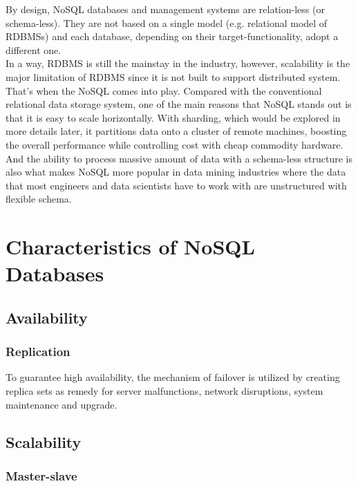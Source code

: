 \noindent By design, NoSQL databases and management systems are relation-less (or
schema-less). They are not based on a single model (e.g. relational
model of RDBMSs) and each database, depending on their
target-functionality, adopt a different one.\\


\noindent In a way, RDBMS is still the mainstay in the industry, however, scalability is the major limitation of RDBMS since it is not built to support distributed system. That's when the NoSQL comes into play. Compared with the conventional relational data storage system, one of the main reasons that NoSQL stands out is that it is easy to scale horizontally. With sharding, which would be explored in more details later, it partitions data onto a cluster of remote machines, boosting the overall performance while controlling cost with cheap commodity hardware. And the ability to process massive amount of data with a schema-less structure is also what makes NoSQL more popular in data mining industries where the data that most engineers and data scientists have to work with are  unstructured with flexible schema.\\


\section{Characteristics of NoSQL Databases}



\subsection{Availability}

\subsubsection{Replication}\mbox{}

To guarantee high availability, the mechanism of failover is utilized by creating replica sets as remedy for server malfunctions, network disruptions, system maintenance and upgrade. 

\subsection{Scalability}

\subsubsection{Master-slave}\mbox{}

